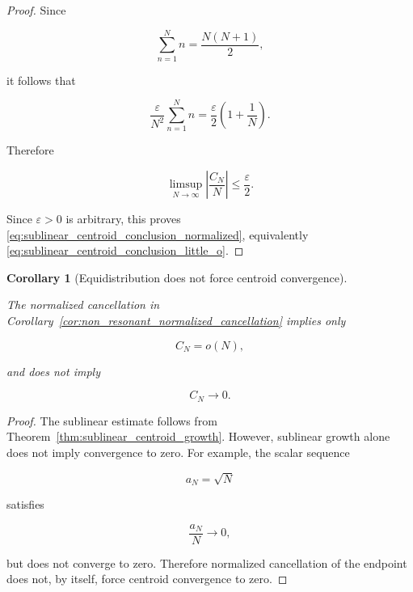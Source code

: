 \documentclass[11pt]{amsart}
\numberwithin{equation}{section}
\theoremstyle{plain}
\newtheorem{corollary}[theorem]{Corollary}
\theoremstyle{definition}
\theoremstyle{remark}
\begin{document}
\begin{proof}
Since

\begin{equation}
\sum_{n=1}^{N}n
=
\frac{N(N+1)}{2},
\label{eq:sum_first_N_integers_centroid}
\end{equation}

it follows that

\begin{equation}
\frac{\varepsilon}{N^2}\sum_{n=1}^{N}n
=
\frac{\varepsilon}{2}\left(1+\frac{1}{N}\right).
\label{eq:centroid_tail_bound_evaluated}
\end{equation}

Therefore

\begin{equation}
\limsup_{N\to\infty}
\left|\frac{C_N}{N}\right|
\leq
\frac{\varepsilon}{2}.
\label{eq:centroid_limsup_epsilon}
\end{equation}

Since \(\varepsilon>0\) is arbitrary, this proves
\eqref{eq:sublinear_centroid_conclusion_normalized}, equivalently
\eqref{eq:sublinear_centroid_conclusion_little_o}.

\end{proof}

\begin{corollary}[Equidistribution does not force centroid convergence]
\label{cor:equidistribution_does_not_force_CN_zero}

The normalized cancellation in
Corollary~\ref{cor:non_resonant_normalized_cancellation} implies only

\begin{equation}
C_N=o(N),
\label{eq:centroid_little_o_only_statement}
\end{equation}

and does not imply

\begin{equation}
C_N\longrightarrow 0.
\label{eq:centroid_zero_not_implied_statement}
\end{equation}

\end{corollary}

\begin{proof}
The sublinear estimate follows from
Theorem~\ref{thm:sublinear_centroid_growth}. However, sublinear growth
alone does not imply convergence to zero. For example, the scalar sequence

\begin{equation}
a_N=\sqrt N
\label{eq:scalar_sublinear_example}
\end{equation}

satisfies

\begin{equation}
\frac{a_N}{N}\longrightarrow 0,
\label{eq:scalar_sublinear_example_normalized}
\end{equation}

but does not converge to zero. Therefore normalized cancellation of the
endpoint does not, by itself, force centroid convergence to zero.
\end{proof}
\end{document}
